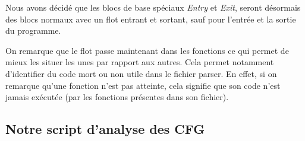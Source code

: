 Nous avons décidé que les blocs de base spéciaux \textit{Entry} et \textit{Exit}, seront désormais des blocs normaux avec un flot entrant et sortant, sauf pour l'entrée et la sortie du programme.

On remarque que le flot passe maintenant dans les fonctions ce qui permet de mieux les situer les unes par rapport aux autres. Cela permet notamment d'identifier du code mort ou non utile dans le fichier parser. En effet, si on remarque qu'une fonction n'est pas atteinte, cela signifie que son code n'est jamais exécutée (par les fonctions présentes dans son fichier).

\subsection{Notre script d'analyse des CFG}